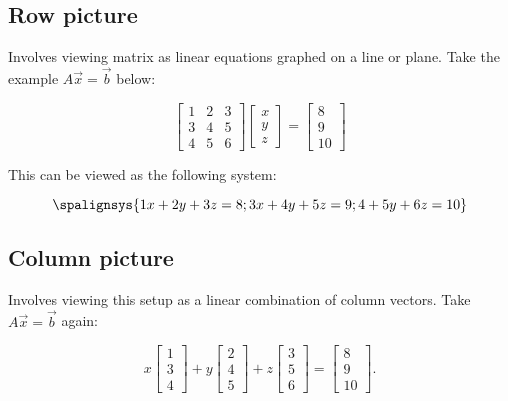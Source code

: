 \subsection{Row picture}

Involves viewing matrix as linear equations graphed on a line or plane. Take the example $A\vec{x}=\vec{b}$ below:

\[\begin{bmatrix}
        1&2&3\\
        3&4&5\\
        4&5&6
    \end{bmatrix}
    \begin{bmatrix}
        x\\y\\z
    \end{bmatrix}
    =
    \begin{bmatrix}
        8\\9\\10
    \end{bmatrix}
\]

This can be viewed as the following system:

\[
    \spalignsys{
    1x + 2y + 3z = 8 ;
    3x + 4y + 5z = 9 ;
     4 + 5y + 6z = 10
    }
\]

\subsection{Column picture}

Involves viewing this setup as a linear combination of column vectors. Take $A\vec{x}=\vec{b}$ again:

\[
    x\begin{bmatrix}
        1\\3\\4
    \end{bmatrix}
    +y\begin{bmatrix}
        2\\4\\5
    \end{bmatrix}
    +z\begin{bmatrix}
        3\\5\\6
    \end{bmatrix}
    =
    \begin{bmatrix}
        8\\9\\10
    \end{bmatrix}.
\]

